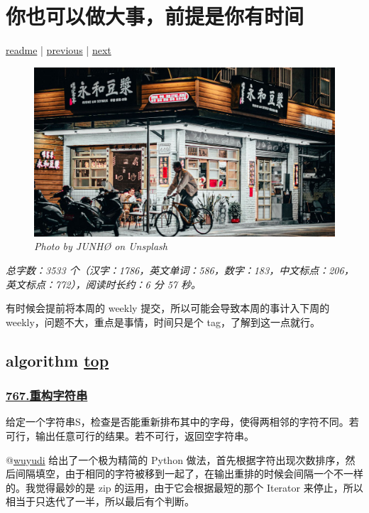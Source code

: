 \chapter{你也可以做大事，前提是你有时间}\label{chap:w6}

\noindent \href{https://github.com/taseikyo/arts}{readme} | \hyperref[chap:w5]{previous} | \hyperref[chap:w7]{next}

\begin{figure}[htbp]
  \centering
    \includegraphics[width=\textwidth]{../images/2020/12/junho-Hy3h8AXzVis-unsplash.jpg}
  \caption{\textit{Photo by JUNHØ on Unsplash}}
\end{figure}

\textit{总字数：3533 个（汉字：1786，英文单词：586，数字：183，中文标点：206，英文标点：772），阅读时长约：6 分 57 秒。}

有时候会提前将本周的 weekly 提交，所以可能会导致本周的事计入下周的 weekly，问题不大，重点是事情，时间只是个 tag，了解到这一点就行。

\section{algorithm \hyperref[chap:w6]{top}}\label{w6:algorithm}

\subsection{\href{https://leetcode-cn.com/problems/reorganize-string/}{767.重构字符串}}

给定一个字符串S，检查是否能重新排布其中的字母，使得两相邻的字符不同。若可行，输出任意可行的结果。若不可行，返回空字符串。

@\href{https://github.com/wuyudi}{wuyudi} 给出了一个极为精简的 Python 做法，首先根据字符出现次数排序，然后间隔填空，由于相同的字符被移到一起了，在输出重排的时候会间隔一个不一样的。我觉得最妙的是 zip 的运用，由于它会根据最短的那个 Iterator 来停止，所以相当于只迭代了一半，所以最后有个判断。

